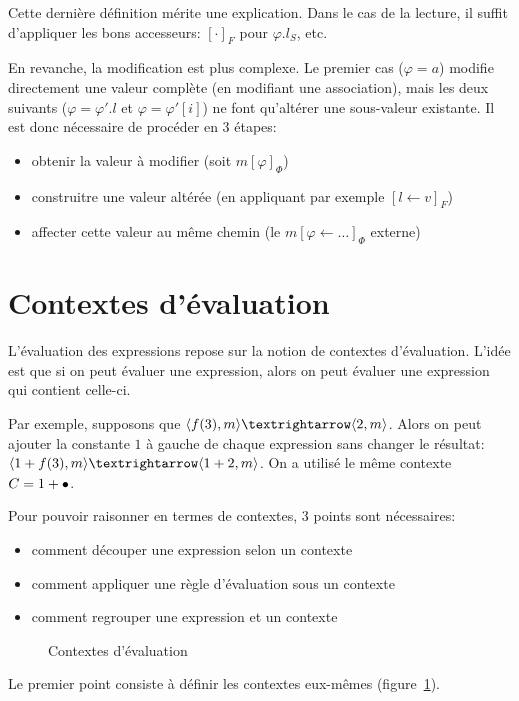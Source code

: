 Cette dernière définition mérite une explication. Dans le cas de la lecture, il
suffit d'appliquer les bons accesseurs: ${[\cdot]}_F$ pour $φ.l_S$, etc.

En revanche, la modification est plus complexe. Le premier cas ($φ = a$) modifie
directement une valeur complète (en modifiant une association), mais les deux
suivants ($φ = φ'.l$ et $φ = φ'[i]$) ne font qu'altérer une sous-valeur
existante. Il est donc nécessaire de procéder en 3 étapes:

\begin{itemize}
\item obtenir la valeur à modifier (soit $m{[φ]}_Φ$)
\item construitre une valeur altérée (en appliquant par exemple ${[l←v]}_F$)
\item affecter cette valeur au même chemin (le $m{[φ ← …]}_Φ$ externe)
\end{itemize}

\section{Contextes d'évaluation}

L'évaluation des expressions repose sur la notion de contextes d'évaluation.
L'idée est que si on peut évaluer une expression, alors on peut évaluer une
expression qui contient celle-ci.

Par exemple, supposons que $\mm{m}{f(3)}{m}{2}$. Alors on peut ajouter la
constante $1$ à gauche de chaque expression sans changer le résultat:
$\mm{m}{1+f(3)}{m}{1+2}$. On a utilisé le même contexte
$C = 1+\bullet$.

Pour pouvoir raisonner en termes de contextes, 3 points sont nécessaires:

\begin{itemize}
\item comment découper une expression selon un contexte
\item comment appliquer une règle d'évaluation sous un contexte
\item comment regrouper une expression et un contexte
\end{itemize}

\begin{figure}
\figctx{}

\caption{Contextes d'évaluation}
\label{fig:eval-ctx}
\end{figure}

Le premier point consiste à définir les contextes eux-mêmes
(figure~\ref{fig:eval-ctx}).

